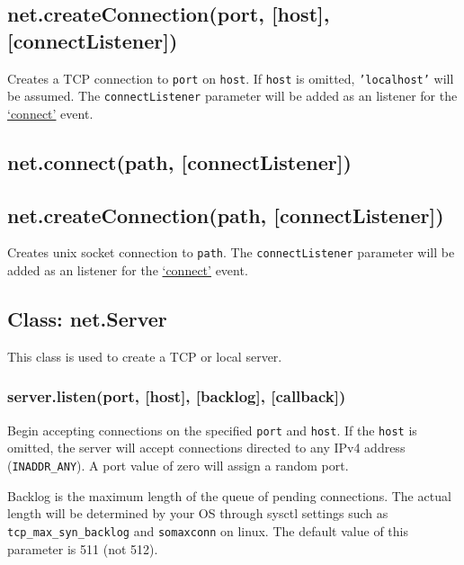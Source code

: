 \subsection{net.createConnection(port, {[}host{]},
{[}connectListener{]})}\label{net.createconnectionport-host-connectlistener}

Creates a TCP connection to \texttt{port} on \texttt{host}. If
\texttt{host} is omitted, \texttt{'localhost'} will be assumed. The
\texttt{connectListener} parameter will be added as an listener for the
\hyperref[netux5feventux5fconnect]{`connect'} event.

\subsection{net.connect(path,
{[}connectListener{]})}\label{net.connectpath-connectlistener}

\subsection{net.createConnection(path,
{[}connectListener{]})}\label{net.createconnectionpath-connectlistener}

Creates unix socket connection to \texttt{path}. The
\texttt{connectListener} parameter will be added as an listener for the
\hyperref[netux5feventux5fconnect]{`connect'} event.

\subsection{Class: net.Server}\label{class-net.server}

This class is used to create a TCP or local server.

\subsubsection{server.listen(port, {[}host{]}, {[}backlog{]},
{[}callback{]})}\label{server.listenport-host-backlog-callback}

Begin accepting connections on the specified \texttt{port} and
\texttt{host}. If the \texttt{host} is omitted, the server will accept
connections directed to any IPv4 address (\texttt{INADDR\_ANY}). A port
value of zero will assign a random port.

Backlog is the maximum length of the queue of pending connections. The
actual length will be determined by your OS through sysctl settings such
as \texttt{tcp\_max\_syn\_backlog} and \texttt{somaxconn} on linux. The
default value of this parameter is 511 (not 512).

